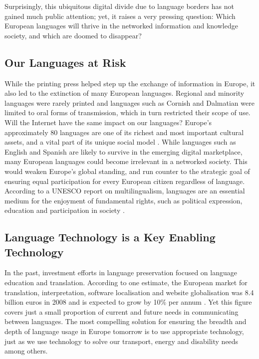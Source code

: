 \documentclass[]{../../metanetpaper}
\begin{document}
\begin{multicols}{2}
Surprisingly, this ubiquitous digital divide due to language borders
has not gained much public attention; yet, it raises a very pressing
question: Which European languages will thrive in the networked
information and knowledge society, and which are doomed to disappear?

\subsection{Our Languages at Risk}

While the printing press helped step up the exchange of
information in Europe, it also led to the extinction of many European
languages. Regional and minority languages were rarely printed and
languages such as Cornish and Dalmatian were limited to oral forms of
transmission, which in turn restricted their scope of use. Will the
Internet have the same impact on our languages?
Europe’s approximately 80 languages are one of its richest and most
important cultural assets, and a vital part of its unique social
model \cite{EC-multi}. While languages such as English and Spanish are
likely to survive in the emerging digital marketplace, many European
languages could become irrelevant in a networked society. This would
weaken Europe’s global standing, and run counter to the strategic goal
of ensuring equal participation for every European citizen regardless
of language. According to a UNESCO report on multilingualism,
languages are an essential medium for the enjoyment of fundamental
rights, such as political expression, education and participation in
society \cite{UN-mid}.

\subsection{Language Technology is a Key Enabling Technology}

In the past, investment efforts in language preservation focused
on language education and translation. According to one estimate, the
European market for translation, interpretation, software localisation
and website globalisation was 8.4 billion euros in 2008 and is
expected to grow by 10\% per annum \cite{EC-size}. Yet this figure
covers just a small proportion of current and future needs in
communicating between languages. The most compelling solution for
ensuring the breadth and depth of language usage in Europe tomorrow is
to use appropriate technology, just as we use technology to solve our
transport, energy and disability needs among others.


\end{multicols}
\end{document}
